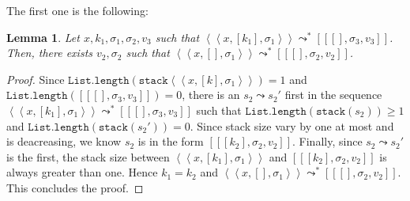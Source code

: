 \documentclass[english, references=cleveref]{programming}
\newtheorem{lemma}[theorem]{Lemma}
\newcommand{\leval}{\left\langle\!\!\left\langle}
\newcommand{\reval}{\right\rangle\!\!\right\rangle}
\newcommand{\lcont}{\left[\!\!\left[}
\newcommand{\rcont}{\right]\!\!\right]}
\begin{document}
The first one is the following:

\begin{lemma}
  Let $x, k_1, \sigma_1, \sigma_2, v_3$ such that $\leval x, [k_1], \sigma_1 \reval \leadsto^* \lcont [], \sigma_3, v_3 \rcont$. Then, there exists $v_2, \sigma_2$ such that $\leval x, [], \sigma_1 \reval \leadsto^* \lcont [], \sigma_2, v_2 \rcont$.
\end{lemma}

\begin{proof}
  Since $\mathtt{List.length}(\mathtt{stack} \leval x, [k], \sigma_1 \reval) = 1$ and $\mathtt{List.length} (\lcont [], \sigma_3, v_3 \rcont) = 0$, there is an $s_2 \leadsto s_2'$ first in the sequence $\leval x, [k_1], \sigma_1 \reval \leadsto^* \lcont [], \sigma_3, v_3 \rcont$ such that $\mathtt{List.length}(\mathtt{stack}(s_2)) \geq 1$ and $\mathtt{List.length}(\mathtt{stack}(s_2')) = 0$. Since stack size vary by one at most and is deacreasing, we know $s_2$ is in the form $\lcont [k_2], \sigma_2, v_2 \rcont$. Finally, since $s_2 \leadsto s_2'$ is the first, the stack size between $\leval x, [k_1], \sigma_1 \reval$ and $\lcont [k_2], \sigma_2, v_2 \rcont$ is always greater than one. Hence $k_1 = k_2$ and $\leval x, [], \sigma_1 \reval \leadsto^* \lcont [], \sigma_2, v_2 \rcont$. This concludes the proof.
\end{proof}




\printbibliography
\end{document}
